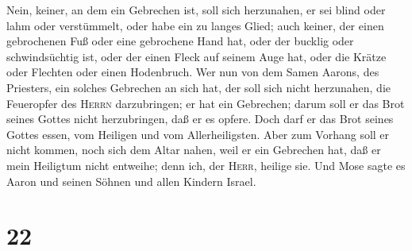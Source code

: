 Nein, keiner, an dem ein Gebrechen ist, soll sich herzunahen, er sei
blind oder lahm oder verstümmelt, oder habe ein zu langes Glied;
 auch keiner, der einen gebrochenen Fuß oder eine
gebrochene Hand hat,  oder der bucklig oder
schwindsüchtig ist, oder der einen Fleck auf seinem Auge hat, oder die
Krätze oder Flechten oder einen Hodenbruch.  Wer nun von
dem Samen Aarons, des Priesters, ein solches Gebrechen an sich hat, der
soll sich nicht herzunahen, die Feueropfer des \textsc{Herrn}
darzubringen; er hat ein Gebrechen; darum soll er das Brot seines Gottes
nicht herzubringen, daß er es opfere.  Doch darf er das
Brot seines Gottes essen, vom Heiligen und vom Allerheiligsten.
 Aber zum Vorhang soll er nicht kommen, noch sich dem
Altar nahen, weil er ein Gebrechen hat, daß er mein Heiligtum nicht
entweihe; denn ich, der \textsc{Herr}, heilige sie.  Und
Mose sagte es Aaron und seinen Söhnen und allen Kindern Israel.

\hypertarget{section-21}{%
\section{22}\label{section-21}}

